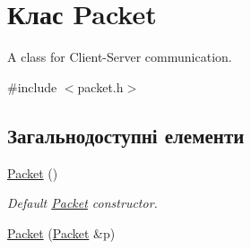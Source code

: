 \hypertarget{classPacket}{\section{Клас Packet}
\label{classPacket}
}


A class for Client-\/\-Server communication.  




{\ttfamily \#include $<$packet.\-h$>$}

\subsection*{Загальнодоступні елементи}
\begin{DoxyCompactItemize}
\item 
\hypertarget{classPacket_aabcfb963c0d5bc0fa554668f92989622}{\hyperlink{classPacket_aabcfb963c0d5bc0fa554668f92989622}{Packet} ()}\label{classPacket_aabcfb963c0d5bc0fa554668f92989622}

\begin{DoxyCompactList}\small\item\em Default \hyperlink{classPacket}{Packet} constructor. \end{DoxyCompactList}\item 
\hypertarget{classPacket_a30fc0d2e5589228708582af6b5b2a576}{\hyperlink{classPacket_a30fc0d2e5589228708582af6b5b2a576}{Packet} (\hyperlink{classPacket}{Packet} \&p)}\label{classPacket_a30fc0d2e5589228708582af6b5b2a576}


\end{DoxyCompactItemize}
